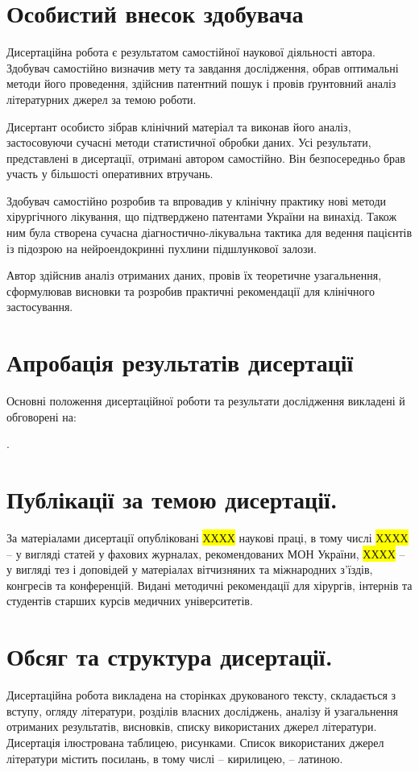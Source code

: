 \section{Особистий внесок здобувача}
Дисертаційна робота є результатом самостійної наукової діяльності автора. Здобувач самостійно визначив мету та завдання дослідження, обрав оптимальні методи його проведення, здійснив патентний пошук і провів ґрунтовний аналіз літературних джерел за темою роботи.

Дисертант особисто зібрав клінічний матеріал та виконав його аналіз, застосовуючи сучасні методи статистичної обробки даних. Усі результати, представлені в дисертації, отримані автором самостійно. Він безпосередньо брав участь у більшості оперативних втручань.

Здобувач самостійно розробив та впровадив у клінічну практику нові методи хірургічного лікування, що підтверджено патентами України на винахід. Також ним була створена сучасна діагностично-лікувальна тактика для ведення пацієнтів із підозрою на нейроендокринні пухлини підшлункової залози.

Автор здійснив аналіз отриманих даних, провів їх теоретичне узагальнення, сформулював висновки та розробив практичні рекомендації для клінічного застосування.


\section{Апробація результатів дисертації} Основні положення дисертаційної роботи та результати дослідження викладені й обговорені на:

.


\section{Публікації за темою дисертації.} За матеріалами дисертації опубліковані \colorbox{yellow}{ХХХХ} наукові праці, в тому числі \colorbox{yellow}{ХХХХ}  – у вигляді статей у фахових журналах, рекомендованих МОН України, \colorbox{yellow}{ХХХХ}  – у вигляді тез і доповідей у матеріалах вітчизняних та міжнародних з’їздів, конгресів та конференцій. Видані методичні рекомендації для хірургів, інтернів та студентів старших курсів медичних університетів.

\section{Обсяг та структура дисертації.} Дисертаційна робота викладена на \pageref{LastPage} сторінках друкованого тексту, складається з вступу, огляду літератури, \totchap\hspace{1pt} розділів власних досліджень, аналізу й узагальнення отриманих результатів, висновків, списку використаних джерел літератури. Дисертація ілюстрована \tottab\hspace{1pt} таблицею, \totfig\hspace{1pt} рисунками. Список використаних джерел літератури містить \hspace{1pt}
посилань, в тому числі  – кирилицею,   – латиною.